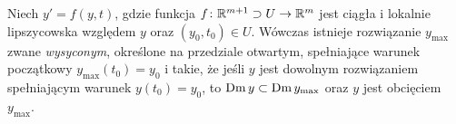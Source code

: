 \begin{theorem}
  Niech $y' = f(y,t)$, gdzie funkcja $f \colon \mathbb{R}^{m+1} \supset U \to \mathbb{R}^m$ jest ciągła i lokalnie
  lipszycowska względem $y$ oraz $(y_0, t_0) \in U$. Wówczas istnieje rozwiązanie $y_{\mathrm{max}}$ zwane
  \emph{wysyconym}, określone na przedziale otwartym, spełniające warunek początkowy $y_{\mathrm{max}}(t_0)
  = y_0$ i takie, że jeśli $y$ jest dowolnym rozwiązaniem spełniającym warunek $y(t_0) = y_0$, to
  $\operatorname{Dm} y \subset \operatorname{Dm} y_{\mathrm{max}}$ oraz $y$ jest obcięciem $y_{\mathrm{max}}$.
\end{theorem}